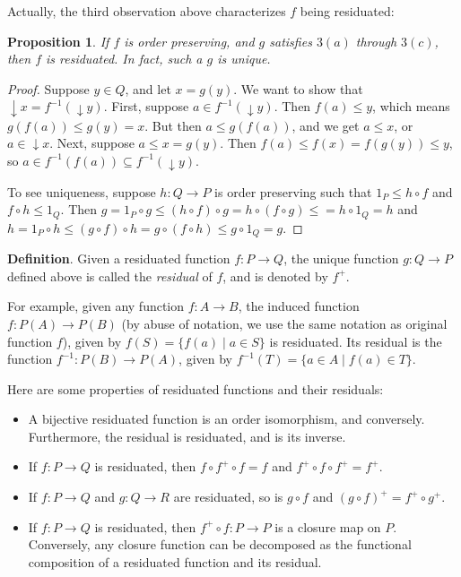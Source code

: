 \documentclass[12pt]{article}
\newtheorem{prop}{Proposition}
\newcommand{\down}{\downarrow\!\!}
\begin{document}
Actually, the third observation above characterizes $f$ being residuated:
\begin{prop} If $f$ is order preserving, and $g$ satisfies $3(a)$ through $3(c)$, then $f$ is residuated.  In fact, such a $g$ is unique.
\end{prop}
\begin{proof}
Suppose $y\in Q$, and let $x=g(y)$.  We want to show that $\down x=f^{-1}(\down y)$.  First, suppose $a \in f^{-1}(\down y)$.  Then $f(a) \le y$, which means $g(f(a))\le g(y)=x$.  But then $a\le g(f(a))$, and we get $a\le x$, or $a\in \down x$.  Next, suppose $a\le x=g(y)$.  Then $f(a) \le f(x) =f(g(y))\le y$, so $a\in f^{-1}(f(a))\subseteq f^{-1}(\down y)$.

To see uniqueness, suppose $h:Q\to P$ is order preserving such that $1_P \le h\circ f$ and $f\circ h\le 1_Q$.  Then $g = 1_P \circ g \le (h \circ f )\circ g = h \circ (f\circ g) \le = h\circ 1_Q = h$ and $h = 1_P \circ h \le (g\circ f) \circ h = g \circ (f \circ h) \le g \circ 1_Q = g$.
\end{proof}

\textbf{Definition}.  Given a residuated function $f:P\to Q$, the unique function $g:Q\to P$ defined above is called the \emph{residual} of $f$, and is denoted by $f^+$.

For example, given any function $f: A\to B$, the induced function $f: P(A)\to P(B)$ (by abuse of notation, we use the same notation as original function $f$), given by $f(S)=\lbrace f(a)\mid a\in S\rbrace$ is residuated.  Its residual is the function $f^{-1}: P(B)\to P(A)$, given by $f^{-1}(T)=\lbrace a \in A\mid f(a)\in T\rbrace$.

Here are some properties of residuated functions and their residuals:
\begin{itemize}
\item A bijective residuated function is an order isomorphism, and conversely.  Furthermore, the residual is residuated, and is its inverse.
\item If $f: P\to Q$ is residuated, then $f\circ f^+ \circ f = f$ and $f^+ \circ f \circ f^+ = f^+$.
\item If $f: P\to Q$ and $g:Q\to R$ are residuated, so is $g\circ f$ and $(g\circ f)^+=f^+\circ g^+$.
\item If $f: P\to Q$ is residuated, then $f^+\circ f: P \to P$ is a closure map on $P$.  Conversely, any closure function can be decomposed as the functional composition of a residuated function and its residual.
\end{itemize}
\end{document}
